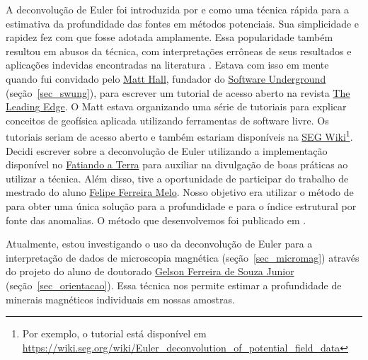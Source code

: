 \documentclass[10pt,a4paper,oneside]{book}
\newcommand{\GelsonLink}{\href{https://www.compgeolab.org/team/\#Souza-junior}{Gelson Ferreira de Souza Junior}}
\newcommand{\SwunngLink}{\href{https://softwareunderground.org/}{Software Underground}}
\newcommand{\FatiandoLink}{\href{https://www.fatiando.org}{Fatiando a Terra}}
\begin{document}
A deconvolução de Euler foi introduzida por \citet{Thompson1982} e
\citet{Reid1990} como uma técnica rápida para a estimativa da profundidade das
fontes em métodos potenciais.
Sua simplicidade e rapidez fez com que fosse adotada amplamente. Essa
popularidade também resultou em abusos da técnica, com interpretações errôneas
de seus resultados e aplicações indevidas encontradas na literatura
\citep{Reid2014}.
Estava com isso em mente quando fui convidado pelo
\href{https://github.com/kwinkunks}{Matt Hall}, fundador do
\SwunngLink{} (seção~\ref{sec_swung}), para escrever um tutorial de acesso
aberto na revista \href{https://library.seg.org/loi/leedff}{The Leading Edge}.
O Matt estava organizando uma série de tutoriais para explicar conceitos de
geofísica aplicada utilizando ferramentas de software livre.
Os tutoriais seriam de acesso aberto e também estariam disponíveis na
\href{https://wiki.seg.org/wiki/Main_Page}{SEG Wiki}\footnote{Por exemplo, o
tutorial \citet{Uieda2014} está disponível em
\url{https://wiki.seg.org/wiki/Euler_deconvolution_of_potential_field_data}}.
Decidi escrever sobre a deconvolução de Euler utilizando a implementação
disponível no \FatiandoLink{} para auxiliar na divulgação de boas práticas
ao utilizar a técnica.
Além disso, tive a oportunidade de participar do trabalho de mestrado do aluno
\href{https://www.pinga-lab.org/people/melo.html}{Felipe Ferreira Melo}.
Nosso objetivo era utilizar o método de \citet{Barbosa1999} para obter uma
única solução para a profundidade e para o índice estrutural por fonte das
anomalias.
O método que desenvolvemos foi publicado em \citet{Melo2013}.

Atualmente, estou investigando o uso da deconvolução de Euler para a
interpretação de dados de microscopia magnética (seção~\ref{sec_micromag})
através do projeto do aluno de doutorado \GelsonLink{}
(seção~\ref{sec_orientacao}).
Essa técnica nos permite estimar a profundidade de minerais magnéticos
individuais em nossas amostras.
\end{document}
